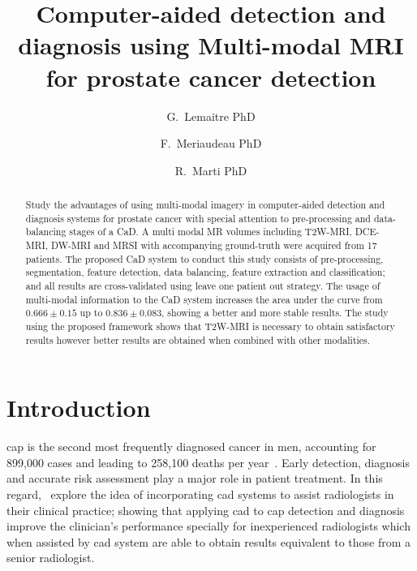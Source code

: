 \documentclass[a4paper,num-refs]{wiley-article}
\title{Computer-aided detection and diagnosis using Multi-modal MRI for prostate cancer detection}
\author[1\authfn{1}]{G.~Lemaitre PhD}
\author[2\authfn{1}]{F.~Meriaudeau PhD}
\author[2\authfn{1}]{R.~Marti PhD}
\affil[1]{Department, Institution, City, State or Province, Postal Code, Country}
\affil[2]{Department, Institution, City, State or Province, Postal Code, Country}
\begin{document}
\maketitle


\begin{abstract}
    Study the advantages of using multi-modal imagery in computer-aided
    detection and diagnosis systems for prostate cancer with special attention to
    pre-processing and data-balancing stages of a CaD.
%
    A multi modal MR volumes including T2W-MRI, DCE-MRI, DW-MRI and MRSI with
    accompanying ground-truth were acquired from 17 patients. The proposed CaD
    system to conduct this study consists of pre-processing, segmentation, feature
    detection, data balancing, feature extraction and classification;
    and all results are cross-validated using leave one patient out strategy.
%
    The usage of multi-modal information to the CaD system increases the area
    under the curve from $0.666\pm0.15$ up to $0.836\pm0.083$, showing a better
    and more stable results.
%
    The study using the proposed framework shows that T2W-MRI is necessary to
    obtain satisfactory results however better results are obtained when combined
    with other modalities.

\end{abstract}


\section{Introduction}

\Ac{cap} is the second most frequently diagnosed cancer in men, accounting for
899,000 cases and leading to 258,100 deaths per
year~\citep{ferlay2010estimates}. Early detection, diagnosis and accurate risk
assessment play a major role in patient treatment. In this regard,
\citeauthor{Hambrock2013}\,\cite{Hambrock2013} explore the idea of
incorporating \ac{cad} systems to assist radiologists in their clinical
practice; showing that applying \ac{cad} to \ac{cap} detection and diagnosis
improve the clinician's performance specially for inexperienced radiologists
which when assisted by \ac{cad} system are able to obtain results equivalent to
those from a senior radiologist.
\end{document}

